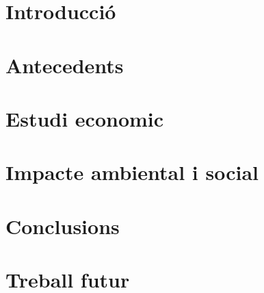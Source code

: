 \documentclass{tfgitic}[2024/07/01]
\title{}
\author{}
\begin{document}

\chapter{Introducció}
\chapter{Antecedents}


\chapter{Estudi economic}
\chapter{Impacte ambiental i social}
\chapter{Conclusions}
\chapter{Treball futur}


\printbibliography

\end{document}
